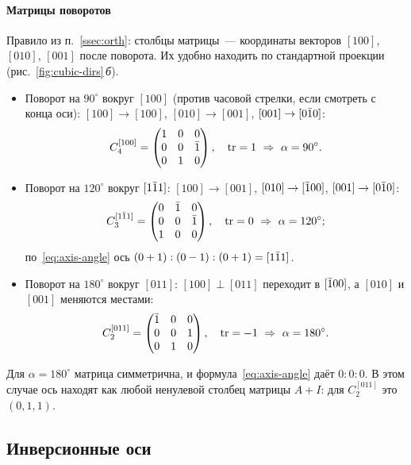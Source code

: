 \paragraph{Матрицы поворотов}
Правило из п.~\ref{ssec:orth}: столбцы матрицы~— координаты векторов $[100]$,
$[010]$, $[001]$ после поворота. Их удобно находить по стандартной
проекции (рис.~\ref{fig:cubic-dirs}\,\textit{б}).
\begin{itemize}
\item Поворот на $90^\circ$ вокруг $[100]$ (против часовой стрелки, если
смотреть с конца оси): $[100]\to[100]$, $[010]\to[001]$, $[001]\to[0\bar{1}0]$:
\[
C_4^{[100]}=\begin{pmatrix}1&0&0\\0&0&\bar{1}\\0&1&0\end{pmatrix},\quad
\operatorname{tr}=1\ \Rightarrow\ \alpha=90^\circ .
\]
\item Поворот на $120^\circ$ вокруг $[1\bar{1}1]$: $[100]\to[001]$,
$[010]\to[\bar{1}00]$, $[001]\to[0\bar{1}0]$:
\[
C_3^{[1\bar{1}1]}=\begin{pmatrix}0&\bar{1}&0\\0&0&\bar{1}\\1&0&0\end{pmatrix},\quad
\operatorname{tr}=0\ \Rightarrow\ \alpha=120^\circ ;
\]
по~\eqref{eq:axis-angle} ось $(0+1):(0-1):(0+1)=[1\bar{1}1]$.
\item Поворот на $180^\circ$ вокруг $[011]$: $[100]\perp[011]$ переходит в
$[\bar{1}00]$, а $[010]$ и $[001]$ меняются местами:
\[
C_2^{[011]}=\begin{pmatrix}\bar{1}&0&0\\0&0&1\\0&1&0\end{pmatrix},\quad
\operatorname{tr}=-1\ \Rightarrow\ \alpha=180^\circ .
\]
\end{itemize}

\begin{vnimanie}
Для $\alpha=180^\circ$ матрица симметрична, и формула~\eqref{eq:axis-angle}
даёт $0:0:0$. В этом случае ось находят как любой ненулевой столбец
матрицы $A+I$: для $C_2^{[011]}$ это $(0,1,1)$.
\end{vnimanie}

\subsection{Инверсионные оси}\label{ssec:inv-axes}

